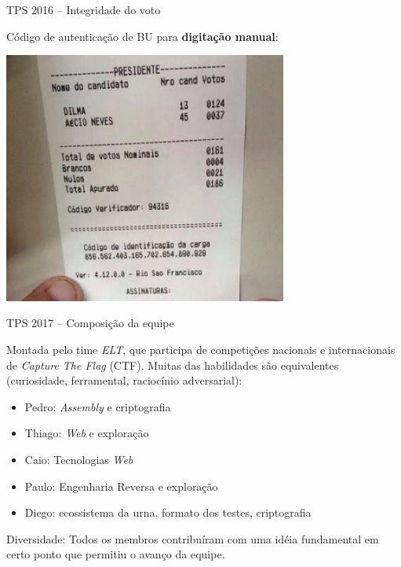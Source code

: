 \documentclass[10pt]{beamer}
\begin{document}
\begin{frame}[fragile]{TPS 2016 -- Integridade do voto}
\begin{center}
Código de autenticação de BU para \textbf{digitação manual}:

\includegraphics[width=0.7\textwidth]{bu.jpg}
\end{center}
\end{frame}

\begin{frame}{TPS 2017 -- Composição da equipe}

Montada pelo time \emph{ELT}, que participa de competições nacionais e internacionais de \emph{Capture The Flag} (CTF). Muitas das habilidades são equivalentes (curiosidade, ferramental, raciocínio adversarial):
\begin{itemize}
 \item Pedro: \emph{Assembly} e criptografia
 \item Thiago: \emph{Web} e exploração 
 \item Caio: Tecnologias \emph{Web}
 \item Paulo: Engenharia Reversa e exploração
 \item Diego: ecossistema da urna, formato dos testes, criptografia
\end{itemize}

\alert{Diversidade:} Todos os membros contribuíram com uma idéia fundamental em certo ponto que permitiu o avanço da equipe.
\end{frame}
\end{document}
